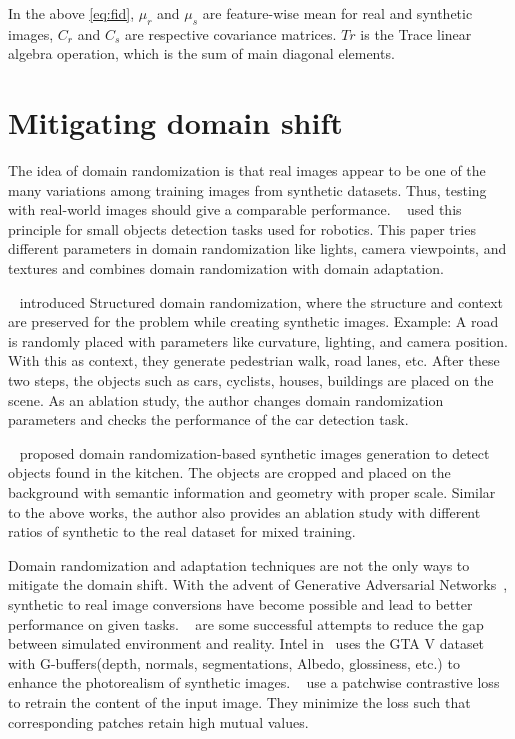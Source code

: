 In the above \autoref{eq:fid}, $\mu_r$ and $\mu_s$ are feature-wise mean for real and synthetic images, $C_r$ and $C_s$ are respective covariance matrices.
$Tr$ is the Trace linear algebra operation, which is the sum of main diagonal elements.


\section{Mitigating domain shift}\label{sec:mitigating_domain_shift}

The idea of domain randomization is that real images appear to be one of the many variations among training images from synthetic datasets.
Thus, testing with real-world images should give a comparable performance.
~\cite{tobin2017domain} used this principle for small objects detection tasks used for robotics.
This paper tries different parameters in domain randomization like lights, camera viewpoints, and textures and combines domain randomization with domain adaptation.

~\cite{prakash2020structured} introduced Structured domain randomization, where the structure and context are preserved for the problem while creating synthetic images.
Example: A road is randomly placed with parameters like curvature, lighting, and camera position.
With this as context, they generate pedestrian walk, road lanes, etc.
After these two steps, the objects such as cars, cyclists, houses, buildings are placed on the scene.
As an ablation study, the author changes domain randomization parameters and checks the performance of the car detection task.

~\cite{georgakis2017synthesizing} proposed domain randomization-based synthetic images generation to detect objects found in the kitchen.
The objects are cropped and placed on the background with semantic information and geometry with proper scale.
Similar to the above works, the author also provides an ablation study with different ratios of synthetic to the real dataset for mixed training.

Domain randomization and adaptation techniques are not the only ways to mitigate the domain shift.
With the advent of Generative Adversarial Networks~\cite{Goodfellow2014GenerativeAN}, synthetic to real image conversions have become possible and lead to better performance on given tasks.
~\cite{Richter_2021, CycleGAN2017, park2020cut,isola2017image, dundar2018domain,Wang2018HighResolutionIS} are some successful attempts to reduce the gap between simulated environment and reality.
Intel in~\cite{Richter_2021} uses the GTA V dataset with G-buffers(depth, normals, segmentations, Albedo, glossiness, etc.) to enhance the photorealism of synthetic images.
~\cite{park2020cut} use a patchwise contrastive loss to retrain the content of the input image.
They minimize the loss such that corresponding patches retain high mutual values.

